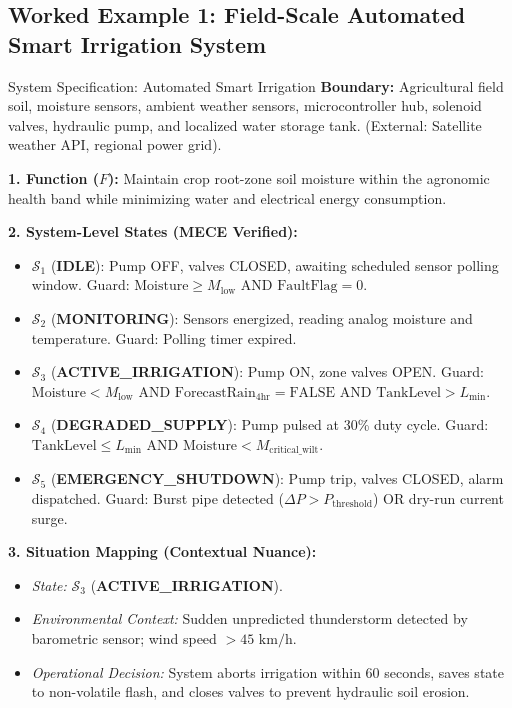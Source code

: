 \subsection{Worked Example 1: Field-Scale Automated Smart Irrigation System}
\begin{examplebox}{System Specification: Automated Smart Irrigation}
\textbf{Boundary:} Agricultural field soil, moisture sensors, ambient weather sensors, microcontroller hub, solenoid valves, hydraulic pump, and localized water storage tank. (External: Satellite weather API, regional power grid).

\textbf{1. Function ($F$):} Maintain crop root-zone soil moisture within the agronomic health band while minimizing water and electrical energy consumption.

\textbf{2. System-Level States (MECE Verified):}
\begin{itemize}[leftmargin=1.5em]
    \item $\mathcal{S}_1$ (\textbf{IDLE}): Pump OFF, valves CLOSED, awaiting scheduled sensor polling window. Guard: $\text{Moisture} \ge M_{\text{low}}$ AND $\text{FaultFlag} = 0$.
    \item $\mathcal{S}_2$ (\textbf{MONITORING}): Sensors energized, reading analog moisture and temperature. Guard: Polling timer expired.
    \item $\mathcal{S}_3$ (\textbf{ACTIVE\_IRRIGATION}): Pump ON, zone valves OPEN. Guard: $\text{Moisture} < M_{\text{low}}$ AND $\text{ForecastRain}_{4\text{hr}} = \text{FALSE}$ AND $\text{TankLevel} > L_{\text{min}}$.
    \item $\mathcal{S}_4$ (\textbf{DEGRADED\_SUPPLY}): Pump pulsed at 30\% duty cycle. Guard: $\text{TankLevel} \le L_{\text{min}}$ AND $\text{Moisture} < M_{\text{critical\_wilt}}$.
    \item $\mathcal{S}_5$ (\textbf{EMERGENCY\_SHUTDOWN}): Pump trip, valves CLOSED, alarm dispatched. Guard: Burst pipe detected ($\Delta P > P_{\text{threshold}}$) OR dry-run current surge.
\end{itemize}

\textbf{3. Situation Mapping (Contextual Nuance):}
\begin{itemize}[leftmargin=1.5em]
    \item \textit{State:} $\mathcal{S}_3$ (\textbf{ACTIVE\_IRRIGATION}).
    \item \textit{Environmental Context:} Sudden unpredicted thunderstorm detected by barometric sensor; wind speed $> 45\text{ km/h}$.
    \item \textit{Operational Decision:} System aborts irrigation within 60 seconds, saves state to non-volatile flash, and closes valves to prevent hydraulic soil erosion.
\end{itemize}


\end{examplebox}
